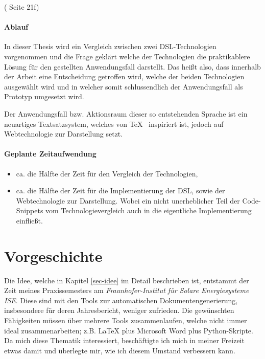(\cite{dsls} Seite 21f)

\paragraph{Ablauf}\label{par-ablauf}

In dieser Thesis wird ein Vergleich zwischen zwei DSL-Technologien vorgenommen
und die Frage geklärt welche der Technologien die praktikablere Lösung für
den gestellten Anwendungsfall darstellt.
Das heißt also, dass innerhalb der Arbeit eine Entscheidung getroffen wird,
welche der beiden Technologien ausgewählt wird und in welcher somit
schlussendlich der Anwendungsfall als Prototyp umgesetzt wird.

Der Anwendungsfall bzw. Aktionsraum dieser so entstehenden Sprache ist ein
neuartiges Textsatzsystem, welches von \TeX~ inspiriert ist, jedoch auf
Webtechnologie zur Darstellung setzt.

\paragraph{Geplante Zeitaufwendung}

\begin{itemize}
  \item ca. die Hälfte der Zeit für den Vergleich der Technologien,
  \item ca. die Hälfte der Zeit für die Implementierung der DSL, sowie
        der Webtechnologie zur Darstellung.
        Wobei ein nicht unerheblicher Teil der Code-Snippets vom Technologievergleich
        auch in die eigentliche Implementierung einfließt.
\end{itemize}

\section{Vorgeschichte}

Die Idee, welche in Kapitel \ref{sec-idee} im Detail beschrieben ist,
entstammt der Zeit meines Praxissemesters am
\emph{Fraunhofer-Institut für Solare Energiesysteme ISE}.
Diese sind mit den Tools zur automatischen Dokumentengenerierung, insbesondere
für deren Jahresbericht, weniger zufrieden. Die gewünschten
Fähigkeiten müssen über mehrere Tools zusammenlaufen, welche nicht immer
ideal zusammenarbeiten; z.B. LaTeX plus Microsoft Word plus Python-Skripte.
Da mich diese Thematik interessiert, beschäftigte ich mich in meiner Freizeit
etwas damit und überlegte mir, wie ich diesem Umstand verbessern kann.

